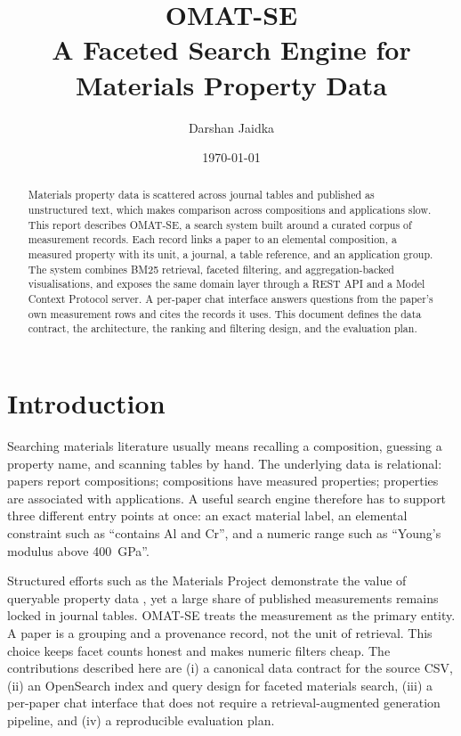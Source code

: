 \documentclass[11pt,a4paper]{article}
\title{%
  \textbf{OMAT-SE}\\[0.35em]
  \large A Faceted Search Engine for Materials Property Data
}
\author{Darshan Jaidka}
\date{\today}
\begin{document}
\maketitle

\begin{abstract}
Materials property data is scattered across journal tables and published as
unstructured text, which makes comparison across compositions and applications
slow. This report describes OMAT-SE, a search system built around a curated
corpus of measurement records. Each record links a paper to an elemental
composition, a measured property with its unit, a journal, a table reference,
and an application group. The system combines BM25 retrieval, faceted filtering,
and aggregation-backed visualisations, and exposes the same domain layer through
a REST API and a Model Context Protocol server. A per-paper chat interface
answers questions from the paper's own measurement rows and cites the records it
uses. This document defines the data contract, the architecture, the ranking and
filtering design, and the evaluation plan.
\end{abstract}

\section{Introduction}

Searching materials literature usually means recalling a composition, guessing a
property name, and scanning tables by hand. The underlying data is relational:
papers report compositions; compositions have measured properties; properties are
associated with applications. A useful search engine therefore has to support
three different entry points at once: an exact material label, an elemental
constraint such as ``contains Al and Cr'', and a numeric range such as ``Young's
modulus above 400~GPa''.

Structured efforts such as the Materials Project demonstrate the value of
queryable property data \citep{jain2013}, yet a large share of published
measurements remains locked in journal tables. OMAT-SE treats the measurement as
the primary entity. A paper is a grouping and a provenance record, not the unit
of retrieval. This choice keeps facet counts honest and makes numeric filters
cheap. The contributions described here are
(i) a canonical data contract for the source CSV, (ii) an OpenSearch index and
query design for faceted materials search, (iii) a per-paper chat interface that
does not require a retrieval-augmented generation pipeline, and (iv) a
reproducible evaluation plan.
\end{document}
